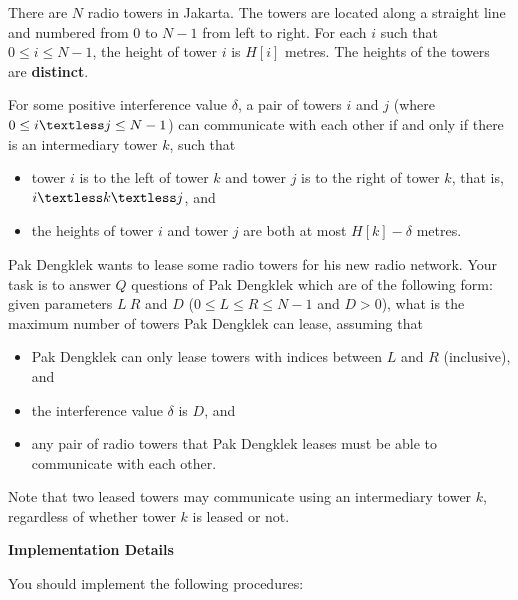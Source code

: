 There are $N$ radio towers in Jakarta.
The towers are located along a straight line and numbered from $0$ to $N - 1$ from left to right.
For each $i$ such that $0 \le i \le N - 1$, the height of tower $i$ is $H[i]$ metres.
The heights of the towers are \textbf{distinct}.

\newcommand{\gt}{\textgreater} 
\newcommand{\lt}{\textless} 

For some positive interference value $\delta$, a pair of towers $i$ and $j$ (where $0 \le i \lt j \le N - 1$) can communicate with each other if and only if there is an intermediary tower $k$, such that
\begin{itemize}
    \item tower $i$ is to the left of tower $k$ and tower $j$ is to the right of tower $k$, that is, $i \lt k \lt j$, and
    \item the heights of tower $i$ and tower $j$ are both at most $H[k] - \delta$ metres.

\end{itemize}

Pak Dengklek wants to lease some radio towers for his new radio network.
Your task is to answer $Q$ questions of Pak Dengklek which are of the following form:
given parameters $L\ R$ and $D$ ($0 \le L \le R \le N - 1$ and $D > 0$), what is the maximum number of towers Pak Dengklek can lease, assuming that

\begin{itemize}
 \item Pak Dengklek can only lease towers with indices between $L$ and $R$ (inclusive), and
 \item the interference value $\delta$ is $D$, and
 \item any pair of radio towers that Pak Dengklek leases must be able to communicate with each other. 

\end{itemize}
Note that two leased towers may communicate using an intermediary tower $k$, regardless of whether tower $k$ is leased or not.


\textbf{Implementation Details}

You should implement the following procedures:

